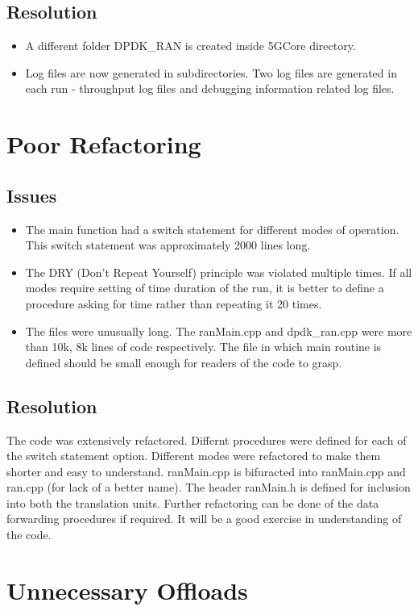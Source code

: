 \subsection{Resolution}
\begin{itemize}
	\item A different folder DPDK\_RAN is created inside 5GCore directory.
	\item Log files are now generated in subdirectories. Two log files are generated in each run - throughput 
	log files and debugging information related log files.
\end{itemize}
\section{Poor Refactoring}

\subsection{Issues}
\begin{itemize}
	\item The main function had a switch statement for different modes of operation. This switch statement was approximately 2000 lines long.
	\item The DRY (Don't Repeat Yourself) principle was violated multiple times. If all modes require setting of time duration of the run, it is better to
	define a procedure asking for time rather than repeating it 20 times.
	\item The files were unusually long. The ranMain.cpp and dpdk\_ran.cpp were more than 10k,  8k lines of code respectively.
	The file in which main routine is defined should be small enough for readers of the code to grasp.
\end{itemize}	
\subsection{Resolution}
The code was extensively refactored. Differnt procedures were defined for each of the switch statement option.
Different modes were refactored to make them shorter and easy to understand. 
ranMain.cpp is bifuracted into ranMain.cpp and ran.cpp (for lack of a better name). The header ranMain.h is defined for
inclusion into both the translation units.
Further refactoring can be done of the data forwarding procedures if required. It will be a good exercise in 
understanding of the code.

\section{Unnecessary Offloads}
